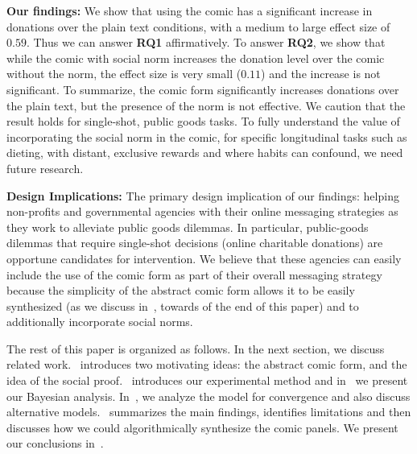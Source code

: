 

\textbf{Our findings:} We show that using the comic has a significant increase in donations over the plain text conditions, with a medium to large effect size of $0.59$. Thus we can answer \textbf{RQ1} affirmatively. To answer \textbf{RQ2}, we show that while the comic with social norm increases the donation level over the comic without the norm, the effect size is very small ($0.11$) and the increase is not significant. To summarize, the comic form significantly increases donations over the plain text, but the presence of the norm is not effective. We caution that the result holds for single-shot, public goods tasks. To fully understand the value of incorporating the social norm in the comic, for specific longitudinal tasks such as dieting, with distant, exclusive rewards and where habits can confound, we need future research.  

\textbf{Design Implications:} The primary design implication of our findings: helping non-profits and governmental agencies with their online messaging strategies as they work to alleviate public goods dilemmas. In particular, public-goods dilemmas that require single-shot decisions (online charitable donations) are opportune candidates for intervention. We believe that these agencies can easily include the use of the comic form as part of their overall messaging strategy because the simplicity of the abstract comic form allows it to be easily synthesized (as we discuss in~, towards of the end of this paper) and to additionally incorporate social norms. 


The rest of this paper is organized as follows. In the next section, we discuss related work.~ introduces two motivating ideas: the abstract comic form, and the idea of the social proof.~ introduces our experimental method and in~ we present our Bayesian analysis. In~, we analyze the model for convergence and also discuss alternative models.~ summarizes the main findings, identifies limitations and then discusses how we could algorithmically synthesize the comic panels. We present our conclusions in~. 
